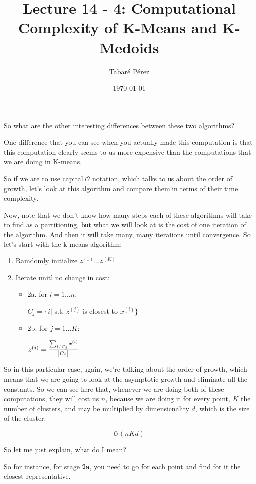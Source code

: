 \documentclass[a4paper, 12pt]{article}
\author{Tabaré Pérez}
\date{\today}
\title{Lecture 14 - 4: Computational Complexity of K-Means and K-Medoids}
\begin{document}
\maketitle
So what are the other interesting differences between these two algorithms?

One difference that you can see when you actually made this computation is
that this computation clearly seems to us more expensive than the computations that
we are doing in K-means.

So if we are to use capital \(\mathcal{O}\) notation, which talks to us about the order
of growth, let's look at this algorithm and compare them in terms of their time
complexity.

Now, note that we don't know how many steps each of these algorithms will take
to find as a partitioning, but what we will look at is the cost of one iteration
of the algorithm. And then it will take many, many iterations until convergence.
So let's start with the k-means algorithm:

\begin{enumerate}
\item Ramdomly initialize \(z^{(1)} \ldots z^{(K)}\)
\item Iterate unitl no change in cost:
\begin{itemize}
\item 2a. for \(i=1 \ldots n\):

\(C_j = \{i|\) s.t. \(z^{(j)}\) is closest to \(x^{(i)}\}\)

\item 2b. for \(j=1 \ldots K\):

\(z^{(j)} = \frac{\sum_{i \in C_j} x^{(i)}}{\abs{C_j}}\)
\end{itemize}
\end{enumerate}

So in this particular case, again, we're talking about the order of growth,
which means that we are going to look at the asymptotic growth and eliminate all
the constants. So we can see here that, whenever we are doing both of these
computations, they will cost us \(n\), because we are doing it for every point,
\(K\) the number of clusters, and may be multiplied by dimensionality \(d\),
which is the size of the cluster:

\begin{equation}
\mathcal{O}(nKd)
\end{equation}

So let me just explain, what do I mean?

So for instance, for stage \textbf{2a}, you need to go for each point and find for it
the closest representative.
\end{document}
